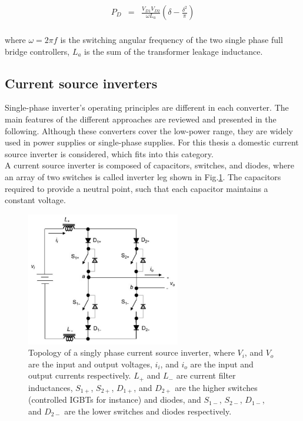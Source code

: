 \begin{equation}
        \begin{array}{rcl}
            P_D&=&\frac{V_{D1}V_{D2}}{\omega L_a}\left(\delta-\frac{\delta^2}{\pi}\right)\\
        \end{array}
        \label{BASICMPC:equ:DCDC}
    \end{equation}
		
		where $\omega=2\pi f$ is the switching angular frequency of the two single phase full bridge controllers, $L_a$ is the
sum of the transformer leakage inductance.

\subsection{Current source inverters}\label{BASICCSR:sec:CSI}

Single-phase inverter's operating principles are different in each converter. The main features of the different approaches are reviewed and presented in the following. Although these converters cover the low-power range, they are widely used in power supplies or single-phase supplies. For this thesis a domestic current source inverter is considered, which fits into this category.\\
A current source inverter is composed of capacitors, switches, and diodes, where an array of two switches is called inverter leg shown in Fig.\ref{BASICCSR:fig:SingleCSI}. The capacitors required to provide a neutral point, such that each capacitor maintains a constant voltage.

\begin{figure}[!ht]
        \centering
        \includegraphics[width=0.6\textwidth]{EMPC_PNG_Pics/CurrentSourceInverter.png}
        \caption{Topology of a singly phase current source inverter, where $V_i$, and $V_o$ are the input and output voltages, $i_i$, and $i_o$ are the input and output currents respectively. $L_+$ and $L_-$ are current filter inductances, $S_{1+}$, $S_{2+}$, $D_{1+}$, and $D_{2+}$ are the higher switches (controlled IGBTs for instance) and diodes, and $S_{1-}$, $S_{2-}$, $D_{1-}$, and $D_{2-}$ are the lower switches and diodes respectively.}
        \label{BASICCSR:fig:SingleCSI}
    \end{figure}

